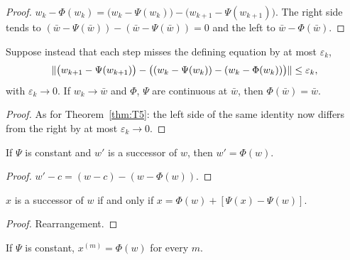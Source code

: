 \begin{proof}
  \leanok
  $w_k-\Phi(w_k)=\bigl(w_k-\Psi(w_k)\bigr)-\bigl(w_{k+1}-\Psi(w_{k+1})\bigr)$.
  The right side tends to $(\bar w-\Psi(\bar w))-(\bar w-\Psi(\bar w))=0$ and the
  left to $\bar w-\Phi(\bar w)$.
\end{proof}

\begin{theorem}\label{thm:T5-inexact}
  \leanok
  Suppose instead that each step misses the defining equation by at most
  $\varepsilon_k$,
  \[
    \lVert \bigl(w_{k+1}-\Psi(w_{k+1})\bigr)
      -\bigl((w_k-\Psi(w_k))-(w_k-\Phi(w_k))\bigr)\rVert\le\varepsilon_k ,
  \]
  with $\varepsilon_k\to0$.  If $w_k\to\bar w$ and $\Phi$, $\Psi$ are continuous
  at $\bar w$, then $\Phi(\bar w)=\bar w$.
\end{theorem}

\begin{proof}
  \leanok
  As for Theorem~\ref{thm:T5}: the left side of the same identity now differs
  from the right by at most $\varepsilon_k\to0$.
\end{proof}

\begin{corollary}\label{cor:T5-const}
  \leanok
  If $\Psi$ is constant and $w'$ is a successor of $w$, then $w'=\Phi(w)$.
\end{corollary}

\begin{proof}
  \leanok
  $w'-c=(w-c)-(w-\Phi(w))$.
\end{proof}

\begin{lemma}\label{lem:T5-inner}
  \leanok
  $x$ is a successor of $w$ if and only if $x=\Phi(w)+[\Psi(x)-\Psi(w)]$.
\end{lemma}

\begin{proof}
  \leanok
  Rearrangement.
\end{proof}

\begin{corollary}\label{cor:T5-inner-const}
  \leanok
  If $\Psi$ is constant, $x^{(m)}=\Phi(w)$ for every $m$.
\end{corollary}

